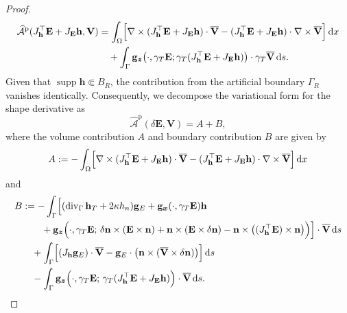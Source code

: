 \documentclass[12pt,reqno]{amsart}
\theoremstyle{definition}
\numberwithin{equation}{section}
\begin{document}
\begin{proof}
\begin{equation*}
\begin{aligned}
\widehat{\mathcal{A}}^{\mathrm{p}}(J_{\mathbf{h}}^{\top} \mathbf{E} + J_{\mathbf{E}} \mathbf{h}, \mathbf{V}) &= \int_\Omega \Bigl[ \nabla \times (J_{\mathbf{h}}^{\top} \mathbf{E} + J_{\mathbf{E}} \mathbf{h}) \cdot \overline{\mathbf{V}} - (J_{\mathbf{h}}^{\top} \mathbf{E} + J_{\mathbf{E}} \mathbf{h}) \cdot \nabla \times \overline{\mathbf{V}} \Bigr] \, \mathrm{d}x \\
&\quad + \int_\Gamma \mathbf{g}_{\boldsymbol{z}} \bigl( \cdot, \gamma_T \mathbf{E}; \gamma_T (J_{\mathbf{h}}^{\top} \mathbf{E} + J_{\mathbf{E}} \mathbf{h}) \bigr) \cdot \gamma_T\overline{\mathbf{V}} \, \mathrm{d}s.
\end{aligned}
\end{equation*}
Given that $\operatorname{supp} \mathbf{h} \Subset B_R$, the contribution from the artificial boundary $\Gamma_R$ vanishes identically. Consequently, we decompose the variational form for the shape derivative as
\[
\widehat{\mathcal{A}}^{\mathrm{p}}(\delta\mathbf{E}, \mathbf{V}) = A + B,
\]
where the volume contribution $A$ and boundary contribution $B$ are given by
\begin{equation*}
A := -\int_\Omega \Bigl[ \nabla \times (J_{\mathbf{h}}^{\top}\mathbf{E} + J_{\mathbf{E}}\mathbf{h}) \cdot \overline{\mathbf{V}} - (J_{\mathbf{h}}^{\top}\mathbf{E} + J_{\mathbf{E}}\mathbf{h}) \cdot \nabla \times \overline{\mathbf{V}} \Bigr] \, \mathrm{d}x 
\end{equation*}
and
\begin{equation*}
\begin{aligned}
B &:= -\int_\Gamma \Bigl[ (\operatorname{div}_\Gamma \mathbf{h}_T + 2\kappa h_n) \mathbf{g}_E + \mathbf{g}_{\boldsymbol{x}}(\cdot, \gamma_T \mathbf{E}) \mathbf{h} \\
&\qquad + \mathbf{g}_{\boldsymbol{z}} \Bigl( \cdot, \gamma_T \mathbf{E}; \, \delta \mathbf{n} \times (\mathbf{E} \times \mathbf{n}) + \mathbf{n} \times (\mathbf{E} \times \delta \mathbf{n}) - \mathbf{n} \times \bigl( (J_{\mathbf{h}}^{\top} \mathbf{E}) \times \mathbf{n} \bigr) \Bigr) \Bigr] \cdot \overline{\mathbf{V}} \, \mathrm{d}s \\
&\quad + \int_\Gamma \Bigl[ (J_{\mathbf{h}} \mathbf{g}_E) \cdot \overline{\mathbf{V}} - \mathbf{g}_E \cdot \bigl( \mathbf{n} \times (\overline{\mathbf{V}} \times \delta \mathbf{n}) \bigr) \Bigr] \, \mathrm{d}s \\
&\quad - \int_\Gamma \mathbf{g}_{\boldsymbol{z}} \Bigl( \cdot, \gamma_T \mathbf{E}; \, \gamma_T(J_{\mathbf{h}}^{\top} \mathbf{E} + J_{\mathbf{E}} \mathbf{h}) \Bigr) \cdot \overline{\mathbf{V}} \, \mathrm{d}s.
\end{aligned}
\end{equation*}


\end{proof}
\end{document}

